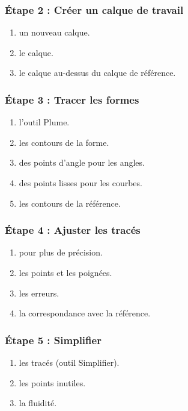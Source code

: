 \subsubsection{Étape 2 : Créer un calque de travail}

\begin{enumerate}
    \item {} un nouveau calque.
    \item {} le calque.
    \item {} le calque au-dessus du calque de référence.
\end{enumerate}

\subsubsection{Étape 3 : Tracer les formes}

\begin{enumerate}
    \item {} l'outil Plume.
    \item {} les contours de la forme.
    \item {} des points d'angle pour les angles.
    \item {} des points lisses pour les courbes.
    \item {} les contours de la référence.
\end{enumerate}

\subsubsection{Étape 4 : Ajuster les tracés}

\begin{enumerate}
    \item {} pour plus de précision.
    \item {} les points et les poignées.
    \item {} les erreurs.
    \item {} la correspondance avec la référence.
\end{enumerate}

\subsubsection{Étape 5 : Simplifier}

\begin{enumerate}
    \item {} les tracés (outil Simplifier).
    \item {} les points inutiles.
    \item {} la fluidité.
\end{enumerate}

